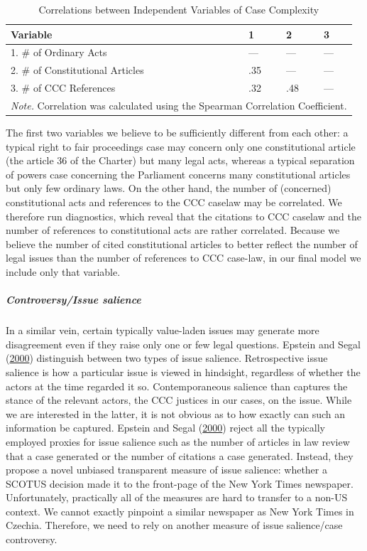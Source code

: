 \documentclass[
  11pt,
]{article}
\begin{document}
\begin{longtable}[t]{llll}
\caption{\label{tab:unnamed-chunk-1}Correlations between Independent Variables of Case Complexity}\\
\toprule
\textbf{Variable} & \textbf{1} & \textbf{2} & \textbf{3}\\
\midrule
1. \# of Ordinary Acts & — & — & —\\
2. \# of Constitutional Articles & .35 & — & —\\
3. \# of CCC References & .32 & .48 & —\\
\bottomrule
\multicolumn{4}{l}{\rule{0pt}{1em}\textit{Note.} Correlation was calculated using the Spearman Correlation Coefficient.}\\
\end{longtable}

The first two variables we believe to be sufficiently different from
each other: a typical right to fair proceedings case may concern only
one constitutional article (the article 36 of the Charter) but many
legal acts, whereas a typical separation of powers case concerning the
Parliament concerns many constitutional articles but only few ordinary
laws. On the other hand, the number of (concerned) constitutional acts
and references to the CCC caselaw may be correlated. We therefore run
diagnostics, which reveal that the citations to CCC caselaw and the
number of references to constitutional acts are rather correlated.
Because we believe the number of cited constitutional articles to better
reflect the number of legal issues than the number of references to CCC
case-law, in our final model we include only that variable.

\hypertarget{controversyissue-salience}{%
\subparagraph*{Controversy/Issue
salience}\label{controversyissue-salience}}

In a similar vein, certain typically value-laden issues may generate
more disagreement even if they raise only one or few legal questions.
Epstein and Segal
(\protect\hyperlink{ref-epsteinMeasuringIssueSalience2000}{2000})
distinguish between two types of issue salience. Retrospective issue
salience is how a particular issue is viewed in hindsight, regardless of
whether the actors at the time regarded it so. Contemporaneous salience
than captures the stance of the relevant actors, the CCC justices in our
cases, on the issue. While we are interested in the latter, it is not
obvious as to how exactly can such an information be captured. Epstein
and Segal
(\protect\hyperlink{ref-epsteinMeasuringIssueSalience2000}{2000}) reject
all the typically employed proxies for issue salience such as the number
of articles in law review that a case generated or the number of
citations a case generated. Instead, they propose a novel unbiased
transparent measure of issue salience: whether a SCOTUS decision made it
to the front-page of the New York Times newspaper. Unfortunately,
practically all of the measures are hard to transfer to a non-US
context. We cannot exactly pinpoint a similar newspaper as New York
Times in Czechia. Therefore, we need to rely on another measure of issue
salience/case controversy.
\end{document}
